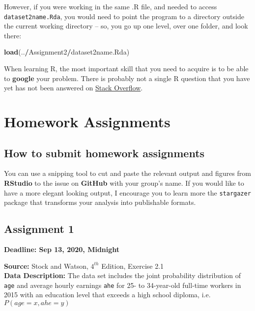 \documentclass[
]{book}
\newenvironment{Shaded}{\begin{snugshade}}{\end{snugshade}}
\newcommand{\KeywordTok}[1]{\textcolor[rgb]{0.13,0.29,0.53}{\textbf{#1}}}
\newcommand{\NormalTok}[1]{#1}
\newcommand{\OperatorTok}[1]{\textcolor[rgb]{0.81,0.36,0.00}{\textbf{#1}}}
\begin{document}
However, if you were working in the same .R file, and needed to access \texttt{dataset2name.Rda}, you would need to point the program to a directory outside the current working directory -- so, you go up one level, over one folder, and look there:

\begin{Shaded}
\begin{Highlighting}[]
\KeywordTok{load}\NormalTok{(..}\OperatorTok{/}\NormalTok{Assignment2}\OperatorTok{/}\NormalTok{dataset2name.Rda)}
\end{Highlighting}
\end{Shaded}

When learning R, the most important skill that you need to acquire is to be able to \textbf{google} your problem. There is probably not a single R question that you have yet has not been answered on \href{https://stackoverflow.com/}{Stack Overflow}.

\hypertarget{homework-assignments}{%
\chapter{Homework Assignments}\label{homework-assignments}}

\hypertarget{how-to-submit-homework-assignments}{%
\section{How to submit homework assignments}\label{how-to-submit-homework-assignments}}

You can use a snipping tool to cut and paste the relevant output and figures from \textbf{RStudio} to the issue on \textbf{GitHub} with your group's name. If you would like to have a more elegant looking output, I encourage you to learn more the \texttt{stargazer} package that transforms your analysis into publishable formats.

\hypertarget{assignment-1}{%
\section{Assignment 1}\label{assignment-1}}

\textbf{Deadline: Sep 13, 2020, Midnight}

\textbf{Source:} Stock and Watson, \(4^{th}\) Edition, Exercise 2.1\\
\textbf{Data Description:} The data set includes the joint probability distribution of \texttt{age} and average hourly earnings \texttt{ahe} for 25- to 34-year-old full-time workers in 2015 with an education level that exceeds a high school diploma, i.e.~\(P(age=x,ahe=y)\)
\end{document}
